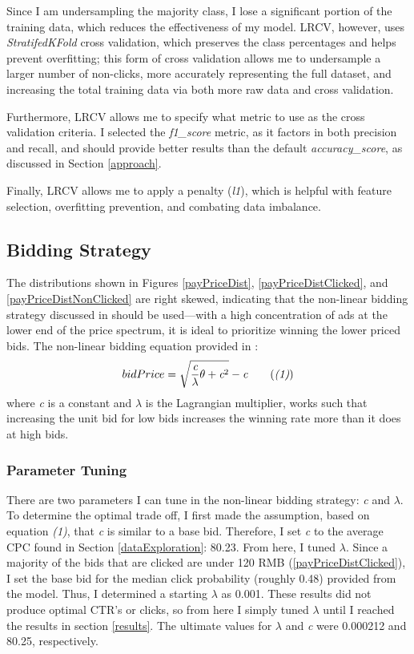 \documentclass{sig-alternate-05-2015}
\begin{document}
Since I am undersampling the majority class, I lose a significant portion of the training data, which reduces the effectiveness of my model. LRCV, however, uses \textit{StratifedKFold} cross validation, which preserves the class percentages and helps prevent overfitting; this form of cross validation allows me to undersample a larger number of non-clicks, more accurately representing the full dataset, and increasing the total training data via both more raw data and cross validation.

Furthermore, LRCV allows me to specify what metric to use as the cross validation criteria. I selected the \textit{f1\_score} metric, as it factors in both precision and recall, and should provide better results than the default \textit{accuracy\_score}, as discussed in Section \ref{approach}.

Finally, LRCV allows me to apply a penalty (\textit{l1}), which is helpful with feature selection, overfitting prevention, and combating data imbalance.

\subsection{Bidding Strategy} \label{biddingStrategy}
The distributions shown in Figures \ref{payPriceDist}, \ref{payPriceDistClicked}, and \ref{payPriceDistNonClicked} are right skewed, indicating that the non-linear bidding strategy discussed in \cite{nonlinear} should be used---with a high concentration of ads at the lower end of the price spectrum, it is ideal to prioritize winning the lower priced bids.  The non-linear bidding equation provided in \cite{nonlinear}:
\begin{equation}
bidPrice = \sqrt{\frac{\textit{c}}{\lambda}\theta + \textit{c}^{2}} - \textit{c} \tag{\textit{(1)}}
\end{equation}
where \textit{c} is a constant and $\lambda$ is the Lagrangian multiplier, works such that increasing the unit bid for low bids increases the winning rate more than it does at high bids.

\subsubsection{Parameter Tuning}
There are two parameters I can tune in the non-linear bidding strategy: \textit{c} and $\lambda$.  To determine the optimal trade off, I first made the assumption, based on equation \textit{(1)}, that \textit{c} is similar to a base bid. Therefore, I set \textit{c} to the average CPC found in Section \ref{dataExploration}: 80.23.  From here, I tuned $\lambda$.  Since a majority of the bids that are clicked are under 120 RMB (\ref{payPriceDistClicked}), I set the base bid for the median click probability (roughly 0.48) provided from the model.  Thus, I determined a starting $\lambda$ as 0.001.  These results did not produce optimal CTR's or clicks, so from here I simply tuned $\lambda$ until I reached the results in section \ref{results}.  The ultimate values for $\lambda$ and \textit{c} were 0.000212 and 80.25, respectively.
\end{document}
